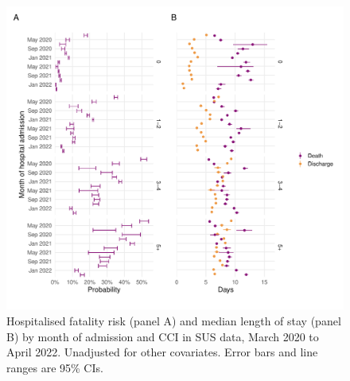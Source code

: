 \begin{figure}[htbp!]
    \centering
    \includegraphics[width=\textwidth]{hfr_month_cci.pdf}
    \caption[Hospitalised fatality risk and median length of stay by month of admission and CCI in SUS data, March 2020 to April 2022]{Hospitalised fatality risk (panel A) and median length of stay (panel B) by month of admission and CCI in SUS data, March 2020 to April 2022. Unadjusted for other covariates. Error bars and line ranges are 95\% CIs.}\label{fig:hfr-month-cci}
\end{figure}

